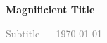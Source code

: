 



\thispagestyle{my_style}
\vspace*{2cm}  %
\enlargethispage{-1cm} %
\Huge %
\textbf{Magnificient Title}

\large
\textcolor{gray}{
Subtitle --- \today
}



\setcounter{page}{1}
